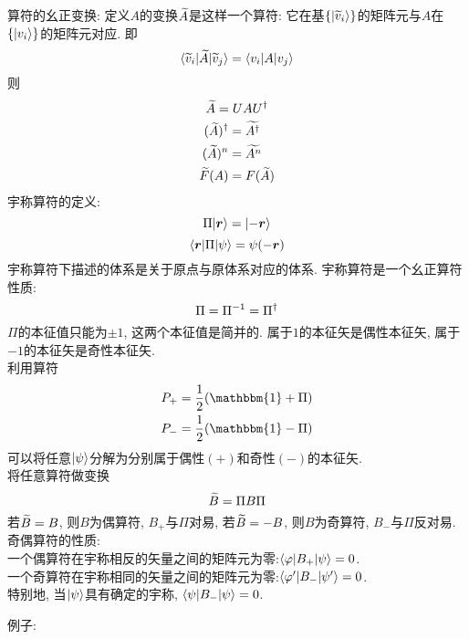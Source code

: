 \documentclass[UTF8]{ctexart}
\numberwithin{equation}{subsection}
\begin{document}
算符的幺正变换:
定义$A$的变换$\widetilde{A}$是这样一个算符: 它在基$\{| {\widetilde{v}_i} \rangle\}$的矩阵元与$A$在$\{| {v_i} \rangle\}$的矩阵元对应. 即
$$\langle {\widetilde{v}_i|\widetilde{A}|\widetilde{v}_j} \rangle = \langle {v_i|A|v_j} \rangle$$
则
$$\widetilde{A}=UAU^{\dagger}$$
$$\begin{aligned} 
    (\widetilde{A})^{\dagger} &= \widetilde{A^{\dagger}}\\
    (\widetilde{A})^n &= \widetilde{A^n}\\
    \widetilde{F}(A) &= F(\widetilde{A})
 \end{aligned}$$
宇称算符的定义:
$$\Pi| {\bm{r}} \rangle=| {-\bm{r}} \rangle$$
$$\langle {\bm{r}|\Pi|\psi} \rangle=\psi(-\bm{r})$$
宇称算符下描述的体系是关于原点与原体系对应的体系. 宇称算符是一个幺正算符\\
性质:\\
$$\Pi=\Pi^{-1}=\Pi^{\dagger}$$
$\Pi$的本征值只能为$\pm1$, 这两个本征值是简并的. 属于$1$的本征矢是偶性本征矢, 属于$-1$的本征矢是奇性本征矢.\\
利用算符
$$\ar{
    P_+=\ff{2}(\mathbbm{1}+\Pi)\\
    P_-=\ff{2}(\mathbbm{1}-\Pi)
}$$
可以将任意$| {\psi} \rangle$分解为分别属于偶性$(+)$和奇性$(-)$的本征矢. \\
将任意算符做变换
$$\widetilde{B}=\Pi B \Pi$$
若$\widetilde{B}=B$, 则$B$为偶算符, $B_+$与$\Pi$对易, 若$\widetilde{B}=-B$, 则$B$为奇算符, $B_-$与$\Pi$反对易.\\
奇偶算符的性质:\\
一个偶算符在宇称相反的矢量之间的矩阵元为零:$\langle {\varphi|B_+|\psi} \rangle=0$. \\
一个奇算符在宇称相同的矢量之间的矩阵元为零:$\langle {\varphi'|B_-|\psi'} \rangle=0$. \\
特别地, 当$| {\psi} \rangle$具有确定的宇称, $\langle {\psi|B_-|\psi} \rangle=0$.

例子:
\end{document}
